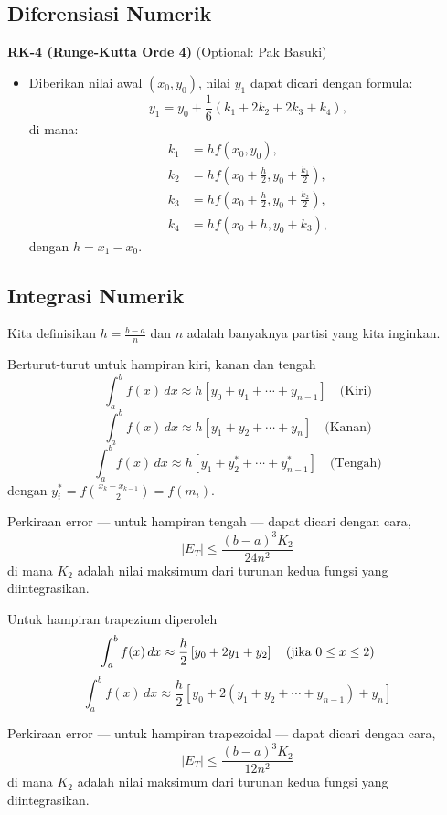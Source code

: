 \documentclass[a4paper,extrafontsizes, 9pt]{memoir}
\begin{document}
\begin{multicols}{3}
\subsection*{\small Diferensiasi Numerik}
\textbf{RK-4 (Runge-Kutta Orde 4)} (Optional: Pak Basuki)
\begin{itemize}
  \item Diberikan nilai awal $(x_0, y_0)$, nilai $y_1$ dapat dicari dengan formula:
\[ y_1 = y_0 + \frac{1}{6}(k_1 + 2k_2 + 2k_3 + k_4), \]
    di mana:
    \begin{align*}
      k_1 & = h f(x_0, y_0), \\
      k_2 & = h f \left( x_0 + \frac{h}{2}, y_0 + \frac{k_1}{2} \right), \\
      k_3 & = h f \left( x_0 + \frac{h}{2}, y_0 + \frac{k_2}{2} \right), \\
      k_4 & = h f(x_0 + h, y_0 + k_3),
    \end{align*}
    dengan $h = x_1 - x_0$.
\end{itemize}

\subsection*{\small Integrasi Numerik}
Kita definisikan \( h = \frac{b - a}{n} \) dan \( n \) adalah banyaknya partisi yang kita inginkan.

Berturut-turut untuk hampiran kiri, kanan dan tengah
\[
\int_a^b f(x) \, dx \approx h \left[ y_0 + y_1 + \cdots + y_{n-1} \right] \quad \text{(Kiri)}
\]
\[
\int_a^b f(x) \, dx \approx h \left[ y_1 + y_2 + \cdots + y_n \right] \quad \text{(Kanan)}
\]
\[
\int_a^b f(x) \, dx \approx h \left[ y_1 + y_2^* + \cdots + y_{n-1}^* \right] \quad \text{(Tengah)}
\]
dengan \( y_i^* = f\left( \frac{x_k - x_{k-1}}{2} \right) = f(m_i) \).

Perkiraan error — untuk hampiran tengah — dapat dicari dengan cara,
\[
|E_T| \leq \frac{(b - a)^3 K_2}{24 n^2}
\]
di mana \( K_2 \) adalah nilai maksimum dari turunan kedua fungsi yang diintegrasikan.

Untuk hampiran trapezium diperoleh
\[
\int_a^b f(x) \, dx \approx \frac{h}{2} \left[ y_0 + 2y_1 + y_2 \right] \quad \text{(jika \( 0 \leq x \leq 2 \))}
\]
\[
\int_a^b f(x) \, dx \approx \frac{h}{2} \left[ y_0 + 2 \left( y_1 + y_2 + \cdots + y_{n-1} \right) + y_n \right]
\]

Perkiraan error — untuk hampiran trapezoidal — dapat dicari dengan cara,
\[
|E_T| \leq \frac{(b - a)^3 K_2}{12 n^2}
\]
di mana \( K_2 \) adalah nilai maksimum dari turunan kedua fungsi yang diintegrasikan.


\end{multicols}
\end{document}
